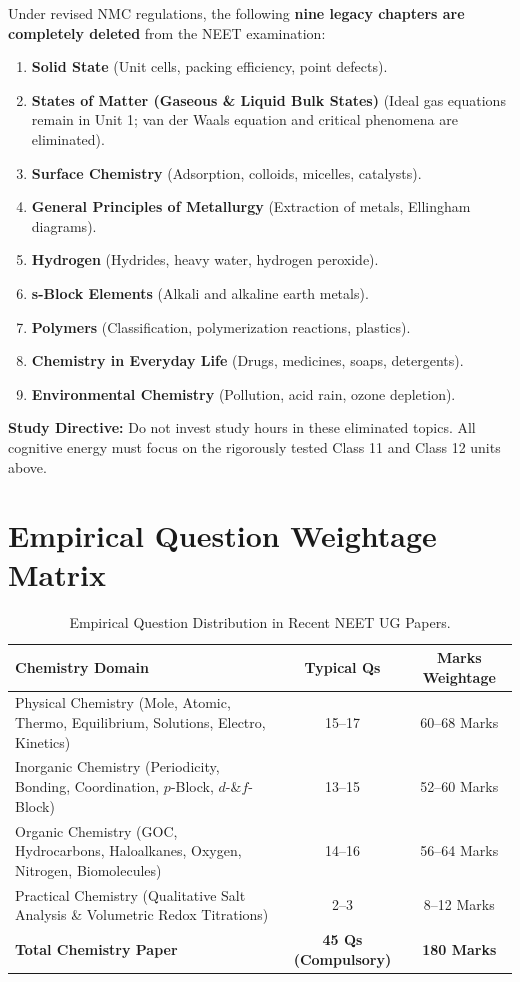 \documentclass[10pt,twoside,openright]{book}
\begin{document}
\begin{trapbox}
Under revised NMC regulations, the following \textbf{nine legacy chapters are completely deleted} from the NEET examination:
\begin{enumerate}
  \item \textbf{Solid State} (Unit cells, packing efficiency, point defects).
  \item \textbf{States of Matter (Gaseous \& Liquid Bulk States)} (Ideal gas equations remain in Unit 1; van der Waals equation and critical phenomena are eliminated).
  \item \textbf{Surface Chemistry} (Adsorption, colloids, micelles, catalysts).
  \item \textbf{General Principles of Metallurgy} (Extraction of metals, Ellingham diagrams).
  \item \textbf{Hydrogen} (Hydrides, heavy water, hydrogen peroxide).
  \item \textbf{s-Block Elements} (Alkali and alkaline earth metals).
  \item \textbf{Polymers} (Classification, polymerization reactions, plastics).
  \item \textbf{Chemistry in Everyday Life} (Drugs, medicines, soaps, detergents).
  \item \textbf{Environmental Chemistry} (Pollution, acid rain, ozone depletion).
\end{enumerate}
\textbf{Study Directive:} Do not invest study hours in these eliminated topics. All cognitive energy must focus on the rigorously tested Class 11 and Class 12 units above.
\end{trapbox}

\section*{Empirical Question Weightage Matrix}

\begin{table}[htbp]
\centering
\footnotesize
\setlength{\tabcolsep}{4pt}
\renewcommand{\arraystretch}{1.2}
\begin{tabularx}{\textwidth}{L c c}
\toprule
\textbf{Chemistry Domain} & \textbf{Typical Qs} & \textbf{Marks Weightage} \\
\midrule
Physical Chemistry (Mole, Atomic, Thermo, Equilibrium, Solutions, Electro, Kinetics) & 15--17 & 60--68 Marks \\
Inorganic Chemistry (Periodicity, Bonding, Coordination, $p$-Block, $d$-\&$f$-Block) & 13--15 & 52--60 Marks \\
Organic Chemistry (GOC, Hydrocarbons, Haloalkanes, Oxygen, Nitrogen, Biomolecules) & 14--16 & 56--64 Marks \\
Practical Chemistry (Qualitative Salt Analysis \& Volumetric Redox Titrations) & 2--3 & 8--12 Marks \\
\midrule
\textbf{Total Chemistry Paper} & \textbf{45 Qs (Compulsory)} & \textbf{180 Marks} \\
\bottomrule
\end{tabularx}
\caption{Empirical Question Distribution in Recent NEET UG Papers.}
\end{table}
\end{document}
